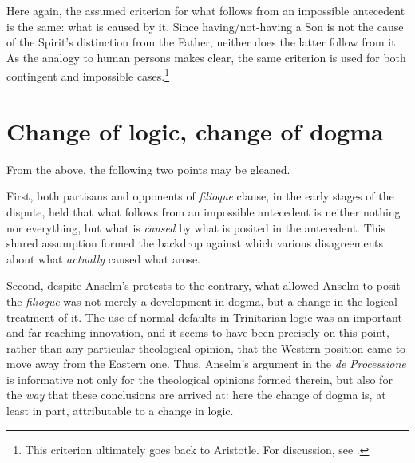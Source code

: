 \documentclass[]{article}
\begin{document}
Here again, the assumed criterion for what follows from an impossible antecedent is the same: what is caused by it. Since having/not-having a Son is not the cause of the Spirit's distinction from the Father, neither does the latter follow from it. As the analogy to human persons makes clear, the same criterion is used for both contingent and impossible cases.\footnote{This criterion ultimately goes back to Aristotle. For discussion, see \autocite{Castagnoli2016}.}

\section{Change of logic, change of dogma}
From the above, the following two points may be gleaned. 

First, both partisans and opponents of \textit{filioque} clause, in the early stages of the dispute, held that what follows from an impossible antecedent is neither nothing nor everything, but what is \textit{caused} by what is posited in the antecedent. This shared assumption formed the backdrop against which various disagreements about what \textit{actually} caused what arose. 

Second, despite Anselm's protests to the contrary, what allowed Anselm to posit the \textit{filioque} was not merely a development in dogma, but a change in the logical treatment of it. The use of normal defaults in Trinitarian logic was an important and far-reaching innovation, and it seems to have been precisely on this point, rather than any particular theological opinion, that the Western position came to move away from the Eastern one. Thus, Anselm's argument in the \textit{de Processione} is informative not only for the theological opinions formed therein, but also for the \textit{way} that these conclusions are arrived at: here the change of dogma is, at least in part, attributable to a change in logic. 
\printbibliography
\end{document}
